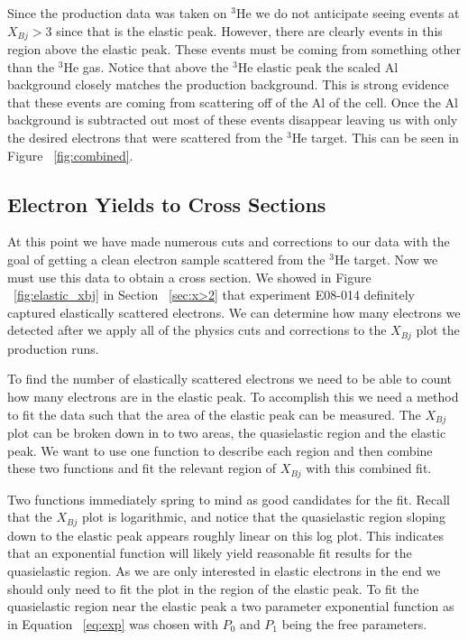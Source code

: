Since the production data was taken on $^3$He we do not anticipate seeing events at $X_{Bj} > 3$ since that is the elastic peak. However, there are clearly events in this region above the elastic peak. These events must be coming from something other than the $^3$He gas. Notice that above the $^3$He elastic peak the scaled Al background closely matches the production background. This is strong evidence that these events are coming from scattering off of the Al of the cell. Once the Al background is subtracted out most of these events disappear leaving us with only the desired electrons that were scattered from the $^3$He target. This can be seen in Figure ~\ref{fig:combined}.

\subsection{Electron Yields to Cross Sections}
\label{ssec:yield}

At this point we have made numerous cuts and corrections to our data with the goal of getting a clean electron sample scattered from the $^3$He target. Now we must use this data to obtain a cross section. We showed in Figure ~\ref{fig:elastic_xbj} in Section ~\ref{sec:x>2} that experiment E08-014 definitely captured elastically scattered electrons. We can determine how many electrons we detected after we apply all of the physics cuts and corrections to the $X_{Bj}$ plot the production runs.

To find the number of elastically scattered electrons we need to be able to count how many electrons are in the elastic peak. To accomplish this we need a method to fit the data such that the area of the elastic peak can be measured. The $X_{Bj}$ plot can be broken down in to two areas, the quasielastic region and the elastic peak. We want to use one function to describe each region and then combine these two functions and fit the relevant region of $X_{Bj}$ with this combined fit. 

Two functions immediately spring to mind as good candidates for the fit. Recall that the $X_{Bj}$ plot is logarithmic, and notice that the quasielastic region sloping down to the elastic peak appears roughly linear on this log plot. This indicates that an exponential function will likely yield reasonable fit results for the quasielastic region. As we are only interested in elastic electrons in the end we should only need to fit the plot in the region of the elastic peak. To fit the quasielastic region near the elastic peak a two parameter exponential function as in Equation ~\ref{eq:exp} was chosen with $P_0$ and $P_1$ being the free parameters.

